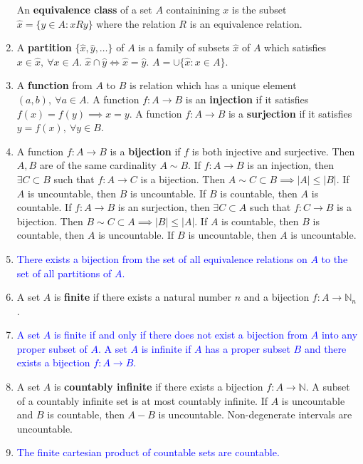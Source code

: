 \begin{enumerate}
		\subitem An \textbf{equivalence class} of a set $A$ containining $x$ is the subset $\hat{x} = \{ y \in A : xRy \}$ where the relation $R$ is an equivalence relation.
	\item A \textbf{partition} $\{\hat{x},\hat{y},\dots\}$ of $A$ is a family of subsets $\hat{x}$ of $A$ which satisfies
		\subitem $x \in \hat{x},\ \forall x \in A$.
		\subitem $\hat{x} \cap \hat{y} \iff \hat{x} = \hat{y}$.
		\subitem $A = \cup \{ \hat{x} : x \in A\}$.
	\item A \textbf{function} from $A$ to $B$ is relation which has a unique element $(a,b),\ \forall a \in A$.
		\subitem A function $f : A \to B$ is an \textbf{injection} if it satisfies $f(x) = f(y) \implies x = y$. 
		\subitem A function $f : A \to B$ is a \textbf{surjection} if it satisfies $y = f(x),\ \forall y \in B$.
	\item A function $f : A \to B$ is a \textbf{bijection} if $f$ is both injective and surjective.
	Then $A,B$ are of the same cardinality $A \sim B$.
		\subitem If $f : A \to B$ is an injection, then $\exists C \subset B$ such that $f : A \to C$ is a bijection.
		Then $A \sim C \subset B \implies |A| \le |B|$.
		If $A$ is uncountable, then $B$ is uncountable. If $B$ is countable, then $A$ is countable.
		\subitem If $f : A \to B$ is an surjection, then $\exists C \subset A$ such that $f : C \to B$ is a bijection.
		Then $B \sim C \subset A \implies |B| \le |A|$.
		If $A$ is countable, then $B$ is countable, then $A$ is uncountable.
		If $B$ is uncountable, then $A$ is uncountable.
	\item \textcolor{blue}{There exists a bijection from the set of all equivalence relations on $A$ to the set of all partitions of $A$.}
	\item A set $A$ is \textbf{finite} if there exists a natural number $n$ and a bijection $f : A \to \mathbb{N}_n$.
	\item \textcolor{blue}{A set $A$ is finite if and only if there does not exist a bijection from $A$ into any proper subset of $A$. A set $A$ is infinite if $A$ has a proper subset $B$ and there exists a bijection $f : A \to B$.}
	\item A set $A$ is \textbf{countably infinite} if there exists a bijection $f : A \to \mathbb{N}$. 
		\subitem A subset of a countably infinite set is at most countably infinite.
		\subitem If $A$ is uncountable and $B$ is countable, then $A-B$ is uncountable. 
		\subitem Non-degenerate intervals are uncountable.
	\item \textcolor{blue}{The finite cartesian product of countable sets are countable.}\\

\end{enumerate}
